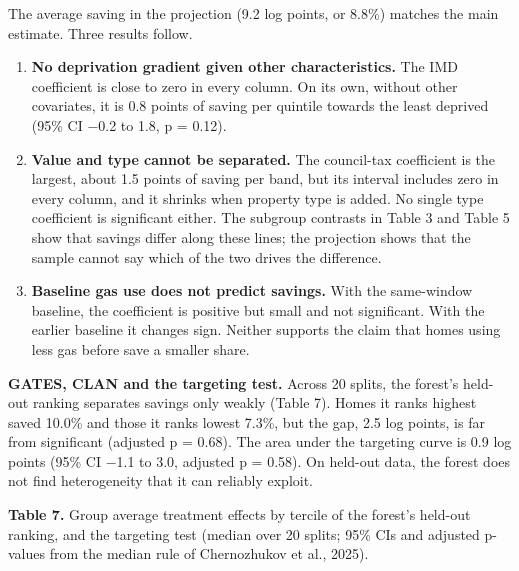 \documentclass[11pt,a4paper]{article}
\providecommand{\tightlist}{\setlength{\itemsep}{0pt}\setlength{\parskip}{0pt}}
\begin{document}
The average saving in the projection (9.2 log points, or 8.8\%) matches the main estimate. Three results follow.

\begin{enumerate}
\def\labelenumi{\arabic{enumi}.}
\tightlist
\item
  \textbf{No deprivation gradient given other characteristics.} The IMD coefficient is close to zero in every column. On its own, without other covariates, it is 0.8 points of saving per quintile towards the least deprived (95\% CI −0.2 to 1.8, p = 0.12).
\item
  \textbf{Value and type cannot be separated.} The council-tax coefficient is the largest, about 1.5 points of saving per band, but its interval includes zero in every column, and it shrinks when property type is added. No single type coefficient is significant either. The subgroup contrasts in Table 3 and Table 5 show that savings differ along these lines; the projection shows that the sample cannot say which of the two drives the difference.
\item
  \textbf{Baseline gas use does not predict savings.} With the same-window baseline, the coefficient is positive but small and not significant. With the earlier baseline it changes sign. Neither supports the claim that homes using less gas before save a smaller share.
\end{enumerate}

\textbf{GATES, CLAN and the targeting test.} Across 20 splits, the forest's held-out ranking separates savings only weakly (Table 7). Homes it ranks highest saved 10.0\% and those it ranks lowest 7.3\%, but the gap, 2.5 log points, is far from significant (adjusted p = 0.68). The area under the targeting curve is 0.9 log points (95\% CI −1.1 to 3.0, adjusted p = 0.58). On held-out data, the forest does not find heterogeneity that it can reliably exploit.

\textbf{Table 7.} Group average treatment effects by tercile of the forest's held-out ranking, and the targeting test (median over 20 splits; 95\% CIs and adjusted p-values from the median rule of Chernozhukov et al., 2025).
\end{document}
